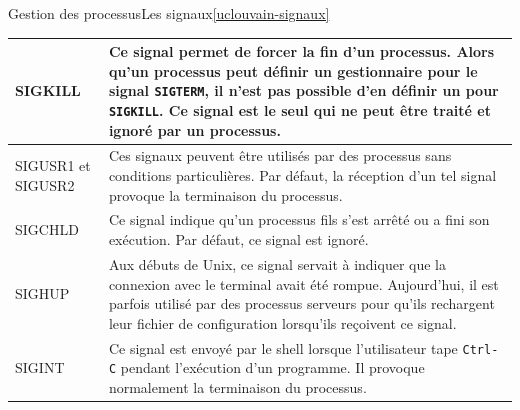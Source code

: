 \documentclass{beamer}
\begin{document}
\begin{frame}{Gestion des processus}{Les signaux\cref{uclouvain-signaux}}
\begin{tiny}
\begin{table}[h!]
\begin{tabular}{|p{2cm}|p{9cm}|}
                    \hline
                    SIGKILL            & Ce signal permet de forcer la fin d'un processus. Alors qu'un processus peut définir un gestionnaire pour le signal \lstinline{SIGTERM}, il n'est pas possible d'en définir un pour \lstinline{SIGKILL}. Ce signal est le seul qui ne peut être traité et ignoré par un processus. \\
                    \hline
                    SIGUSR1 et SIGUSR2 & Ces signaux peuvent être utilisés par des processus sans conditions particulières. Par défaut, la réception d'un tel signal provoque la terminaison du processus.                                                                                                                  \\
                    \hline
                    SIGCHLD            & Ce signal indique qu'un processus fils s'est arrêté ou a fini son exécution. Par défaut, ce signal est ignoré.                                                                                                                                                                     \\
                    \hline
                    SIGHUP             & Aux débuts de Unix, ce signal servait à indiquer que la connexion avec le terminal avait été rompue. Aujourd'hui, il est parfois utilisé par des processus serveurs pour qu'ils rechargent leur fichier de configuration lorsqu'ils reçoivent ce signal.                           \\
                    \hline
                    SIGINT             & Ce signal est envoyé par le shell lorsque l'utilisateur tape \lstinline{Ctrl-C} pendant l'exécution d'un programme. Il provoque normalement la terminaison du processus.                                                                                                           \\
                    \hline
                \end{tabular}
            \end{table}
        \end{tiny}
    \end{frame}
\end{document}
